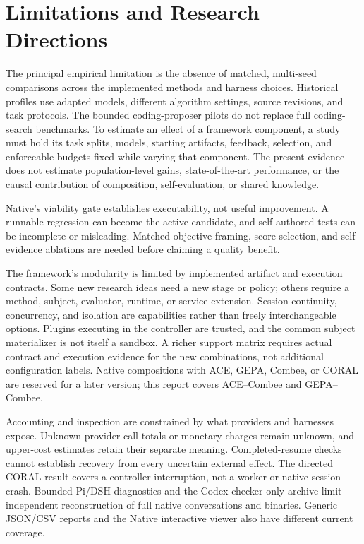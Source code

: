 \section{Limitations and Research Directions}
\label{sec:limits}

The principal empirical limitation is the absence of matched, multi-seed comparisons across the implemented methods and harness choices. Historical profiles use adapted models, different algorithm settings, source revisions, and task protocols. The bounded coding-proposer pilots do not replace full coding-search benchmarks. To estimate an effect of a framework component, a study must hold its task splits, models, starting artifacts, feedback, selection, and enforceable budgets fixed while varying that component. The present evidence does not estimate population-level gains, state-of-the-art performance, or the causal contribution of composition, self-evaluation, or shared knowledge.

Native's viability gate establishes executability, not useful improvement. A runnable regression can become the active candidate, and self-authored tests can be incomplete or misleading. Matched objective-framing, score-selection, and self-evidence ablations are needed before claiming a quality benefit.

The framework's modularity is limited by implemented artifact and execution contracts. Some new research ideas need a new stage or policy; others require a method, subject, evaluator, runtime, or service extension. Session continuity, concurrency, and isolation are capabilities rather than freely interchangeable options. Plugins executing in the controller are trusted, and the common subject materializer is not itself a sandbox. A richer support matrix requires actual contract and execution evidence for the new combinations, not additional configuration labels. Native compositions with ACE, GEPA, Combee, or CORAL are reserved for a later version; this report covers ACE--Combee and GEPA--Combee.

Accounting and inspection are constrained by what providers and harnesses expose. Unknown provider-call totals or monetary charges remain unknown, and upper-cost estimates retain their separate meaning. Completed-resume checks cannot establish recovery from every uncertain external effect. The directed CORAL result covers a controller interruption, not a worker or native-session crash. Bounded Pi/DSH diagnostics and the Codex checker-only archive limit independent reconstruction of full native conversations and binaries. Generic JSON/CSV reports and the Native interactive viewer also have different current coverage.

